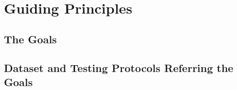 \section{Guiding Principles}
\label{sec:guide}
\subsection{The Goals}
\subsection{Dataset and Testing Protocols Referring the Goals}